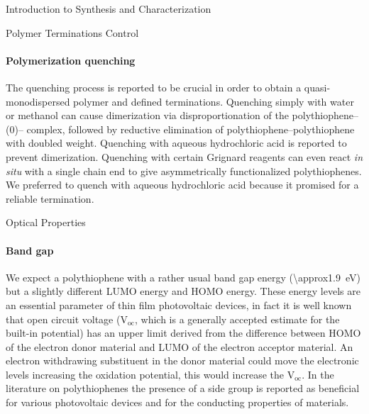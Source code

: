 \begin{section}{Introduction to Synthesis and Characterization}
\begin{subsection}{Polymer Terminations Control}
\paragraph{Polymerization quenching} The quenching process is reported to be crucial in order to obtain a quasi-mono\-dispersed polymer and defined terminations. 
Quenching simply with water or methanol can cause dimerization via disproportionation of the poly\-thio\-phene--(0)-- complex, followed by reductive elimination of poly\-thio\-phene--poly\-thio\-phene with doubled weight. Quenching with aqueous hydrochloric acid is reported to prevent dimerization. 
Quenching with certain Grignard reagents can even react \textit{in situ} with a single chain end to give asymmetrically functionalized poly\-thio\-phenes. We preferred to quench with aqueous hydrochloric acid because it promised for a reliable  termination.

\end{subsection}
\begin{subsection}{Optical Properties}
\paragraph{Band gap} We expect a polythiophene with a rather usual band gap energy (\SI{\approx1.9}{\eV}) but a slightly different \gls{LUMO} 
energy and \gls{HOMO} energy. 
These energy levels are an essential parameter of thin film photovoltaic devices, in fact it is well known that open circuit voltage ($\mathrm{V_{oc}}$, which is a generally accepted estimate for the built-in potential) has an upper limit derived from the difference between \gls{HOMO} of the electron donor material and \gls{LUMO} of the electron acceptor material. An electron withdrawing substituent in the donor material could move the electronic levels increasing the oxidation potential, this would increase the $\mathrm{V_{oc}}$. 
In the literature on polythiophenes the presence of a  side group is reported as beneficial for various photovoltaic devices and for the conducting properties of materials. 


\end{subsection}
\end{section}
